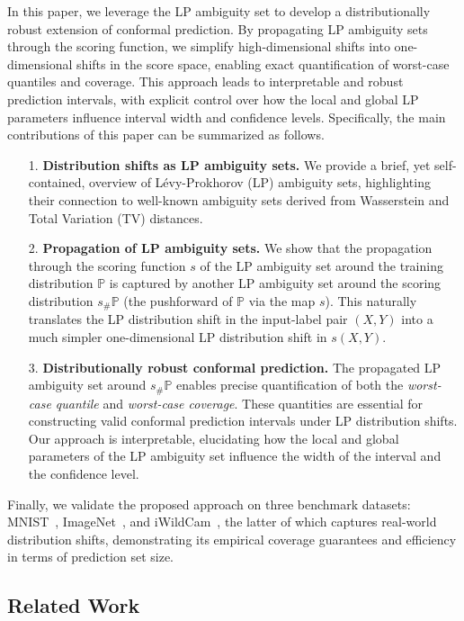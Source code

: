 \documentclass[11pt,a4paper]{article}
\begin{document}
In this paper, we leverage the LP ambiguity set to develop a distributionally robust extension of conformal prediction. By propagating LP ambiguity sets through the scoring function, we simplify high-dimensional shifts into one-dimensional shifts in the score space, enabling exact quantification of worst-case quantiles and coverage. This approach leads to interpretable and robust prediction intervals, with explicit control over how the local and global LP parameters influence interval width and confidence levels. Specifically, the main contributions of this paper can be summarized as follows.
\begin{enumerate}%
    \item[1.] {\bf Distribution shifts as LP ambiguity sets.} We provide a brief, yet self-contained, overview of Lévy-Prokhorov (LP) ambiguity sets, highlighting their connection to well-known ambiguity sets derived from Wasserstein and Total Variation (TV) distances.
    \item[2.] {\bf Propagation of LP ambiguity sets.} We show that the propagation through the scoring function $s$ of the LP ambiguity set around the training distribution $\mathbb P$ is captured by another LP ambiguity set around the scoring distribution $s_\# \mathbb P$ (the pushforward of $\mathbb P$ via the map $s$). This naturally translates the LP distribution shift in the input-label pair $(X,Y)$ into a much simpler one-dimensional LP distribution shift in $s(X,Y)$.
    \item[3.] {\bf Distributionally robust conformal prediction.} The propagated LP ambiguity set around $s_\# \mathbb{P}$ enables precise quantification of both the \emph{worst-case quantile} and \emph{worst-case coverage}. These quantities are essential for constructing valid conformal prediction intervals under LP distribution shifts. Our approach is interpretable, elucidating how the local and global parameters of the LP ambiguity set influence the width of the interval and the confidence level.
\end{enumerate}

Finally, we validate the proposed approach on three benchmark datasets: MNIST~\cite{Lecun_1998}, ImageNet~\cite{Li_2009}, and iWildCam~\cite{Beery_2020}, the latter of which captures real-world distribution shifts, demonstrating its empirical coverage guarantees and efficiency in terms of prediction set size.

\subsection{Related Work}
\label{subsec:related:work}
\end{document}
